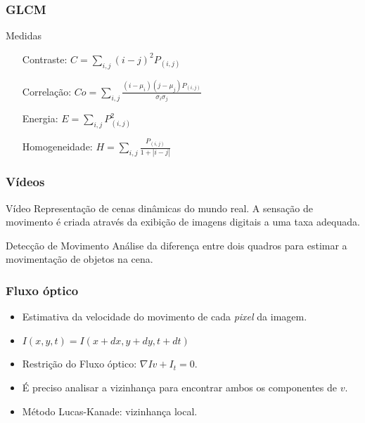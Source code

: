 \documentclass{beamer}
\begin{document}
\begin{frame}
\frametitle{GLCM}
\begin{block}{Medidas}
\begin{itemize}
\centering
\item[Contraste:] $C = \sum_{i,j} (i-j)^{2}P_{(i,j)}$
\item[Correlação:] $Co = \sum_{i,j} \frac{(i - \mu_i)(j - \mu_j)P_{(i,j)}}{\sigma_i\sigma_j}$
\item[Energia:]$E = \sum_{i,j} P_{(i,j)}^{2}$
\item[Homogeneidade:]$H = \sum_{i,j} \frac{P_{(i,j)}}{1+|i-j|}$
\centering
\end{itemize}
\end{block}
\end{frame}

\begin{frame}
\frametitle{Vídeos}
\begin{block}{Vídeo}
Representação de cenas dinâmicas do mundo real. A sensação de movimento é criada através da exibição de imagens digitais a uma taxa adequada.
\end{block}

\begin{block}{Detecção de Movimento}
Análise da diferença entre dois quadros para estimar a movimentação de objetos na cena.
\end{block}
\end{frame}

\begin{frame}
\frametitle{Fluxo óptico}
\begin{itemize}
\item Estimativa da velocidade do movimento de cada \textit{pixel} da imagem.
\item $I(x,y,t) = I(x+dx, y+dy, t+dt)$
\item Restrição do Fluxo óptico: $\nabla Iv + I_t = 0$.
\item É preciso analisar a vizinhança para encontrar ambos os componentes de $v$.
\item Método Lucas-Kanade: vizinhança local.
\end{itemize}
\end{frame}
\end{document}
